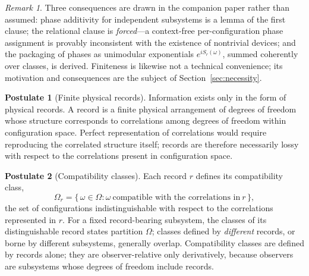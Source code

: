 \documentclass[11pt]{article}
\theoremstyle{definition}
\newtheorem{postulate}{Postulate}
\theoremstyle{remark}
\newtheorem{remark}{Remark}
\begin{document}
\begin{remark}
Three consequences are drawn in the companion paper \cite{TillittBorn} rather than assumed: phase additivity for independent subsystems is a lemma of the first clause; the relational clause is \emph{forced}---a context-free per-configuration phase assignment is provably inconsistent with the existence of nontrivial devices; and the packaging of phases as unimodular exponentials $e^{iS_r(\omega)}$, summed coherently over classes, is derived. Finiteness is likewise not a technical convenience; its motivation and consequences are the subject of Section~\ref{sec:necessity}.
\end{remark}

\begin{postulate}[Finite physical records]\label{post:records}
Information exists only in the form of physical records. A record is a finite physical arrangement of degrees of freedom whose structure corresponds to correlations among degrees of freedom within configuration space. Perfect representation of correlations would require reproducing the correlated structure itself; records are therefore necessarily lossy with respect to the correlations present in configuration space.
\end{postulate}

\begin{postulate}[Compatibility classes]\label{post:classes}
Each record $r$ defines its compatibility class,
\[ \Omega_r = \{\, \omega \in \Omega : \omega \ \text{compatible with the correlations in}\ r \,\}, \]
the set of configurations indistinguishable with respect to the correlations represented in $r$. For a fixed record-bearing subsystem, the classes of its distinguishable record states partition $\Omega$; classes defined by \emph{different} records, or borne by different subsystems, generally overlap. Compatibility classes are defined by records alone; they are observer-relative only derivatively, because observers are subsystems whose degrees of freedom include records.
\end{postulate}
\end{document}
